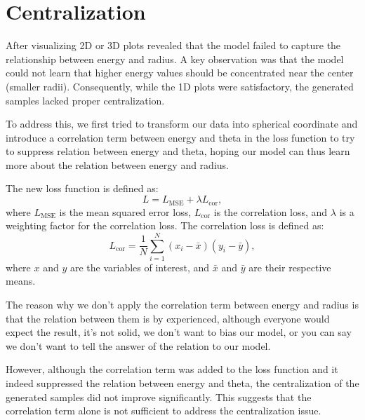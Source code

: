 \section{Centralization}
After visualizing 2D or 3D plots revealed that the model failed to capture the relationship between energy and radius. A key observation was that the model could not learn that higher energy values should be concentrated near the center (smaller radii). Consequently, while the 1D plots were satisfactory, the generated samples lacked proper centralization.

To address this, we first tried to transform our data into spherical coordinate and introduce a correlation term between energy and theta in the loss function to try to suppress relation between energy and theta, hoping our model can thus learn more about the relation between energy and radius. 

The new loss function is defined as:
\begin{equation}
    L = L_{\text{MSE}} + \lambda L_{\text{cor}},
\end{equation}
where $L_{\text{MSE}}$ is the mean squared error loss, $L_{\text{cor}}$ is the correlation loss, and $\lambda$ is a weighting factor for the correlation loss. The correlation loss is defined as:
\begin{equation}
    L_{\text{cor}} = \frac{1}{N} \sum_{i=1}^{N} (x_i - \bar{x})(y_i - \bar{y}),
\end{equation}
where $x$ and $y$ are the variables of interest, and $\bar{x}$ and $\bar{y}$ are their respective means.

The reason why we don't apply the correlation term between energy and radius is that the relation between them is by experienced, although everyone would expect the result, it's not solid, we don't want to bias our model, or you can say we don't want to tell the answer of the relation to our model. 

However, although the correlation term was added to the loss function and it indeed suppressed the relation between energy and theta, the centralization of the generated samples did not improve significantly. This suggests that the correlation term alone is not sufficient to address the centralization issue.


